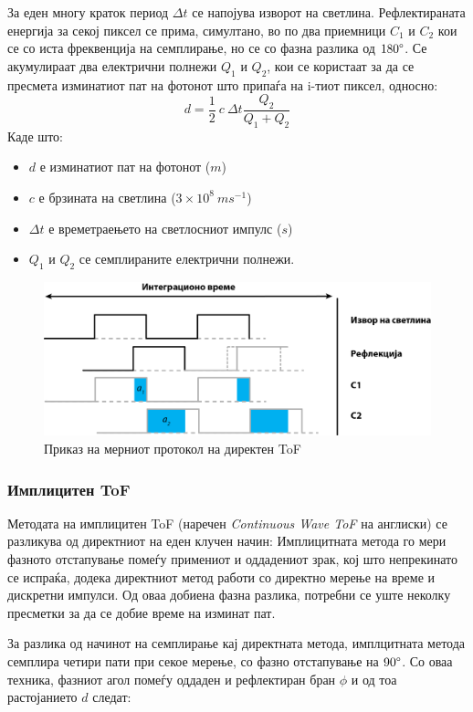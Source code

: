 \documentclass[12pt]{article}
\begin{document}
		За еден многу краток период $ \Delta t $ се напојува изворот на светлина. Рефлектираната енергија за секој пиксел се прима, симултано, во по два приемници $C_1$ и $C_2$ кои се со иста фреквенција на семплирање, но се со фазна разлика од $180 \degree$. Се акумулираат два електрични полнежи $Q_1$ и  $Q_2$, кои се користаат за да се пресмета изминатиот пат на фотонот што припаѓа на i-тиот пиксел, односно:
		$$ d = \frac{1}{2} \ c\  \Delta t \frac{Q_2}{Q_1 + Q_2} $$
		Каде што:
		\begin{itemize}
			\item $d$ е изминатиот пат на фотонот ($m$)
			\item $c$ е брзината на светлина ($ 3 \times 10^8\ ms^{-1} $)
			\item $\Delta t$ е времетраењето на светлосниот импулс ($s$)
			\item $Q_1$ и $Q_2$ се семплираните електрични полнежи.
			\end{itemize}

		\begin{figure}[H]
			\includegraphics[width=0.75\linewidth]{./images/impulseToF.png}
			\centering
			\caption{Приказ на мерниот протокол на директен ToF}
			\label{fig:impulseToF.png}
			\end{figure}

	\subsubsection{Имплицитен ToF}
		Методата на имплицитен ToF (наречен \textit{Continuous Wave ToF} на англиски) се разликува од директниот на еден клучен начин: Имплицитната метода го мери фазното отстапување помеѓу примениот и оддадениот зрак, кој што непрекинато се испраќа, додека директниот метод работи со директно мерење на време и дискретни импулси. Од оваа добиена фазна разлика, потребни се уште неколку пресметки за да се добие време на изминат пат.

		За разлика од начинот на семплирање кај директната метода, имплцитната метода семплира четири пати при секое мерење, со фазно отстапување на $90\degree$. Со оваа техника, фазниот агол помеѓу оддаден и рефлектиран бран $\phi$ и од тоа растојанието $d$ следат:
\end{document}
